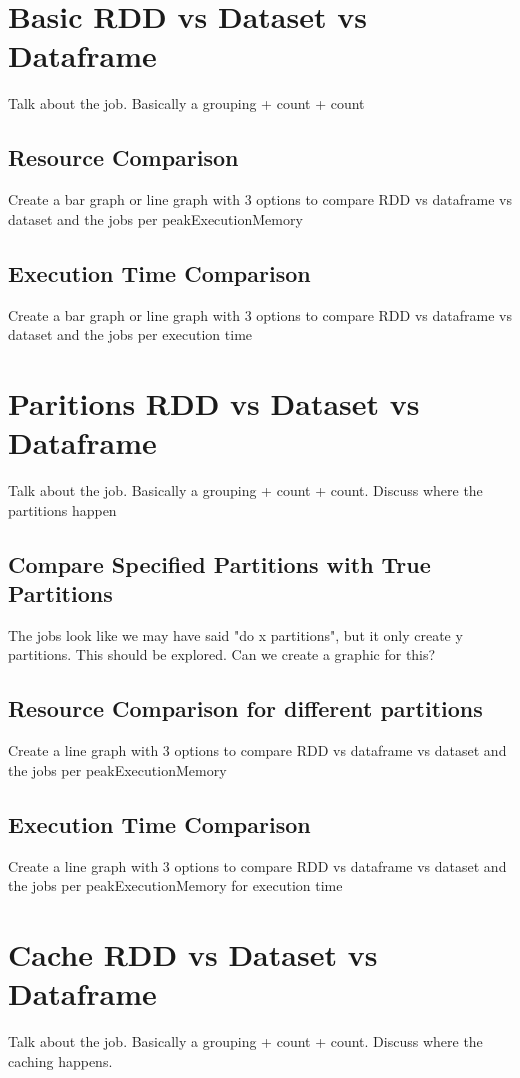 \documentclass[conference]{IEEEtran}
\begin{document}
\section{Basic RDD vs Dataset vs Dataframe}
Talk about the job. Basically a grouping + count + count

\subsection{Resource Comparison}
Create a bar graph or line graph with 3 options to compare RDD vs dataframe vs dataset and the jobs per peakExecutionMemory

\subsection{Execution Time Comparison}
Create a bar graph or line graph with 3 options to compare RDD vs dataframe vs dataset and the jobs per execution time

\section{Paritions RDD vs Dataset vs Dataframe}
Talk about the job. Basically a grouping + count + count.  Discuss where the partitions happen

\subsection{Compare Specified Partitions with True Partitions}
The jobs look like we may have said "do x partitions", but it only create y partitions. This should be explored.
Can we create a graphic for this?

\subsection{Resource Comparison for different partitions}
Create a line graph with 3 options to compare RDD vs dataframe vs dataset and the jobs per peakExecutionMemory

\subsection{Execution Time Comparison}
Create a line graph with 3 options to compare RDD vs dataframe vs dataset and the jobs per peakExecutionMemory for execution time


\section{Cache RDD vs Dataset vs Dataframe}
Talk about the job. Basically a grouping + count + count.  Discuss where the caching happens.
\end{document}

